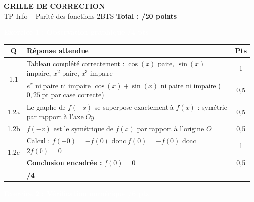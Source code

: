 \documentclass[10pt,a4paper]{article}
\newcommand{\exotitle}[2]{%
  \noindent\colorbox{exoheader}{%
    \parbox{\dimexpr\linewidth-2\fboxsep\relax}{%
      \textcolor{white}{\textbf{\large #1 \hfill #2}}%
    }%
  }%
}
\begin{document}
\begin{center}
	{\LARGE\textbf{GRILLE DE CORRECTION}}\\[1mm]
	{\large TP Info -- Parité des fonctions \hspace{1cm} 2BTS \hspace{1cm} \textbf{Total : /20 points}}
\end{center}

\vspace{2mm}

\exotitle{Exercice 1 : Observation graphique}{/4 pts}

\vspace{1mm}

\begin{tabularx}{\linewidth}{|c|X|c|}
	\hline
	\rowcolor{exolight}
	\textbf{Q} & \textbf{Réponse attendue} & \textbf{Pts} \\
	\hline
	\multirow{2}{*}{1.1} & Tableau complété correctement : $\cos(x)$ paire, $\sin(x)$ impaire, $x^2$ paire, $x^3$ impaire & 1 \\
	\cline{2-3}
	& $e^x$ ni paire ni impaire \quad $\cos(x)+\sin(x)$ ni paire ni impaire \quad ($0{,}25$ pt par case correcte) & 0,5 \\
	\hline
	1.2a & Le graphe de $f(-x)$ se superpose exactement à $f(x)$ : symétrie par rapport à l'axe $Oy$ & 0,5 \\
	\hline
	1.2b & $f(-x)$ est le symétrique de $f(x)$ par rapport à l'origine $O$ & 0,5 \\
	\hline
	\multirow{2}{*}{1.2c} & Calcul : $f(-0) = -f(0)$ donc $f(0) = -f(0)$ donc $2f(0) = 0$ & 1 \\
	\cline{2-3}
	& \textbf{Conclusion encadrée :} $f(0) = 0$ & 0,5 \\
	\hline
	\rowcolor{totalrow}
	\multicolumn{2}{|r|}{\textbf{Sous-total Exercice 1}} & \textbf{/4} \\
	\hline
\end{tabularx}

\vspace{3mm}

\exotitle{Exercice 2 : Vérification numérique}{/6 pts}

\vspace{1mm}
\end{document}
